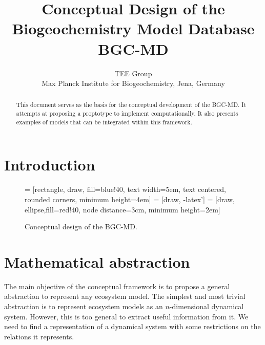 \documentclass[11pt,a4paper]{article}
\title{Conceptual Design of the Biogeochemistry Model Database BGC-MD}
\author{TEE Group \\ Max Planck Institute for Biogeochemistry, Jena, Germany}
\begin{document}
\maketitle

\begin{abstract}
This document serves as the basis for the conceptual development of the BGC-MD. It attempts at proposing a proptotype to implement computationally. It also presents examples of  models that can be integrated within this framework. 
\end{abstract}

\tableofcontents

\section{Introduction}

\begin{figure}[htbp]
   \centering

 = [rectangle, draw, fill=blue!40, 
    text width=5em, text centered, rounded corners, minimum height=4em]
 = [draw, -latex']
 = [draw, ellipse,fill=red!40, node distance=3cm,
    minimum height=2em]


   \caption{Conceptual design of the BGC-MD. }
   \label{fig:dbdesign}
\end{figure}


\section{Mathematical abstraction}
The main objective of the conceptual framework is to propose a general abstraction to represent any ecosystem model. The simplest and most trivial abstraction is to represent ecosystem models as an $n$-dimensional dynamical system. However, this is too general to extract useful information from it. We need to find a representation of a dynamical system with some restrictions on the relations it represents. 
\end{document}
